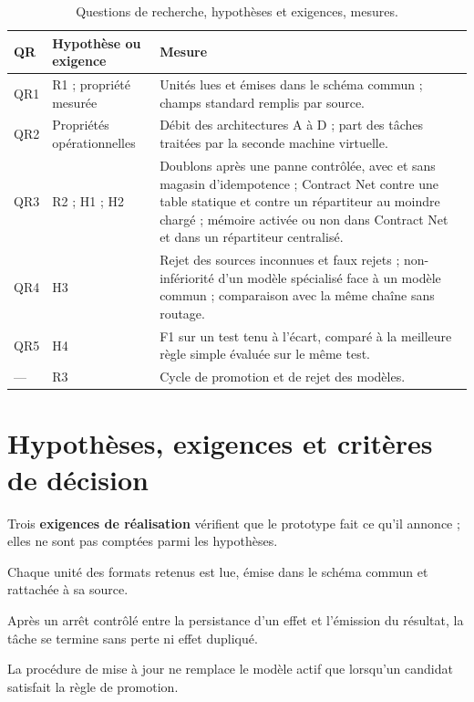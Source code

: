 \begin{table}[H]
\centering
\caption{Questions de recherche, hypothèses et exigences, mesures.}
\label{tab:qr-hypotheses}
\small
\begin{tabularx}{\textwidth}{p{} p{} X}
\toprule
\textbf{QR} & \textbf{Hypothèse ou exigence} & \textbf{Mesure} \\
\midrule
QR1 & R1 ; propriété mesurée & Unités lues et émises dans le schéma commun ; champs standard remplis par source. \\
QR2 & Propriétés opérationnelles & Débit des architectures A à D ; part des tâches traitées par la seconde machine virtuelle. \\
QR3 & R2 ; H1 ; H2 & Doublons après une panne contrôlée, avec et sans magasin d'idempotence ; Contract Net contre une table statique et contre un répartiteur au moindre chargé ; mémoire activée ou non dans Contract Net et dans un répartiteur centralisé. \\
QR4 & H3 & Rejet des sources inconnues et faux rejets ; non-infériorité d'un modèle spécialisé face à un modèle commun ; comparaison avec la même chaîne sans routage. \\
QR5 & H4 & F1 sur un test tenu à l'écart, comparé à la meilleure règle simple évaluée sur le même test. \\
--- & R3 & Cycle de promotion et de rejet des modèles. \\
\bottomrule
\end{tabularx}
\end{table}


\section*{Hypothèses, exigences et critères de décision}


Trois \textbf{exigences de réalisation} vérifient que le prototype fait ce qu'il annonce ; elles ne sont pas comptées parmi les hypothèses.
\begin{description}[leftmargin=1.6cm, style=nextline]
    \item[\textbf{R1.}] Chaque unité des formats retenus est lue, émise dans le schéma commun et rattachée à sa source.
    \item[\textbf{R2.}] Après un arrêt contrôlé entre la persistance d'un effet et l'émission du résultat, la tâche se termine sans perte ni effet dupliqué.
    \item[\textbf{R3.}] La procédure de mise à jour ne remplace le modèle actif que lorsqu'un candidat satisfait la règle de promotion.
\end{description}


